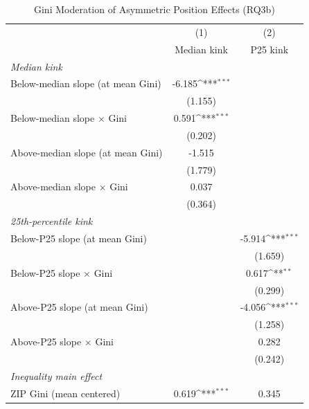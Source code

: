 \begin{table}[htbp]\centering
\def\sym#1{\ifmmode^{#1}\else\(^{#1}\)\fi}
\caption{Gini Moderation of Asymmetric Position Effects (RQ3b)}
\begin{tabular}{l*{2}{c}}
\toprule
            &\multicolumn{1}{c}{(1)}&\multicolumn{1}{c}{(2)}\\
            &\multicolumn{1}{c}{Median kink}&\multicolumn{1}{c}{P25 kink}\\
\midrule
\textit{Median kink}&                     &                     \\
Below-median slope (at mean Gini)&      -6.185\sym{***}&                     \\
            &     (1.155)         &                     \\
Below-median slope $\times$ Gini&       0.591\sym{***}&                     \\
            &     (0.202)         &                     \\
Above-median slope (at mean Gini)&      -1.515         &                     \\
            &     (1.779)         &                     \\
Above-median slope $\times$ Gini&       0.037         &                     \\
            &     (0.364)         &                     \\
\textit{25th-percentile kink}&                     &                     \\
Below-P25 slope (at mean Gini)&                     &      -5.914\sym{***}\\
            &                     &     (1.659)         \\
Below-P25 slope $\times$ Gini&                     &       0.617\sym{**} \\
            &                     &     (0.299)         \\
Above-P25 slope (at mean Gini)&                     &      -4.056\sym{***}\\
            &                     &     (1.258)         \\
Above-P25 slope $\times$ Gini&                     &       0.282         \\
            &                     &     (0.242)         \\
\textit{Inequality main effect}&                     &                     \\
ZIP Gini (mean centered)&       0.619\sym{***}&       0.345         \\

\end{tabular}
\end{table}
